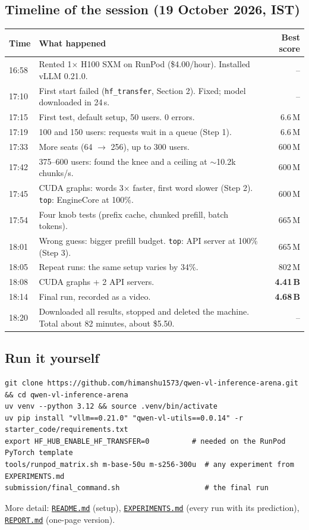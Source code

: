 \documentclass[10pt,a4paper]{article}
\newcommand{\repo}{https://github.com/himanshu1573/qwen-vl-inference-arena}
\newcommand{\file}[1]{\href{\repo/blob/main/#1}{\nolinkurl{#1}}}
\begin{document}
\subsection{Timeline of the session (19 October 2026, IST)}
\begin{center}\small
\renewcommand{\arraystretch}{1.12}
\begin{tabularx}{\linewidth}{@{}l X r@{}}
\toprule
\textbf{Time} & \textbf{What happened} & \textbf{Best score} \\
\midrule
16:58 & Rented 1$\times$ H100 SXM on RunPod (\$4.00/hour). Installed vLLM 0.21.0. & -- \\
17:10 & First start failed (\texttt{hf\_transfer}, Section 2). Fixed; model downloaded in 24\,s. & -- \\
17:15 & First test, default setup, 50 users. 0 errors. & 6.6\,M \\
17:19 & 100 and 150 users: requests wait in a queue (Step 1). & 6.6\,M \\
17:33 & More seats (64 $\rightarrow$ 256), up to 300 users. & 600\,M \\
17:42 & 375--600 users: found the knee and a ceiling at $\sim$10.2k chunks/s. & 600\,M \\
17:45 & CUDA graphs: words 3$\times$ faster, first word slower (Step 2). \texttt{top}: EngineCore at 100\%. & 600\,M \\
17:54 & Four knob tests (prefix cache, chunked prefill, batch tokens). & 665\,M \\
18:01 & Wrong guess: bigger prefill budget. \texttt{top}: API server at 100\% (Step 3). & 665\,M \\
18:05 & Repeat runs: the same setup varies by 34\%. & 802\,M \\
18:08 & CUDA graphs + 2 API servers. & \textbf{4.41\,B} \\
18:14 & Final run, recorded as a video. & \textbf{4.68\,B} \\
18:20 & Downloaded all results, stopped and deleted the machine. Total about 82 minutes, about \$5.50. & -- \\
\bottomrule
\end{tabularx}
\end{center}

\subsection{Run it yourself}
\noindent\begin{minipage}{\linewidth}
\begin{lstlisting}
git clone https://github.com/himanshu1573/qwen-vl-inference-arena.git && cd qwen-vl-inference-arena
uv venv --python 3.12 && source .venv/bin/activate
uv pip install "vllm==0.21.0" "qwen-vl-utils==0.0.14" -r starter_code/requirements.txt
export HF_HUB_ENABLE_HF_TRANSFER=0          # needed on the RunPod PyTorch template
tools/runpod_matrix.sh m-base-50u m-s256-300u  # any experiment from EXPERIMENTS.md
submission/final_command.sh                    # the final run
\end{lstlisting}
\end{minipage}
More detail: \file{README.md} (setup), \file{EXPERIMENTS.md} (every run with its prediction), \file{REPORT.md} (one-page version).
\end{document}
